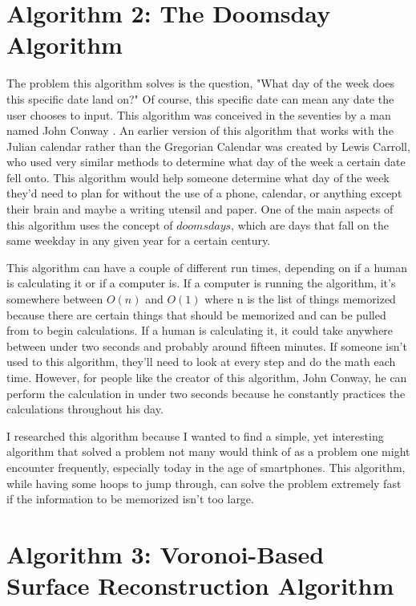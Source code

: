 \documentclass{article}
\begin{document}
\section{Algorithm 2: The Doomsday Algorithm}

The problem this algorithm solves is the question, "What day of the week does this specific date land on?" Of course, this specific date can mean any date the user chooses to input. This algorithm was conceived in the seventies by a man named John Conway \cite{conway}. An earlier version of this algorithm that works with the Julian calendar rather than the Gregorian Calendar was created by Lewis Carroll, who used very similar methods to determine what day of the week a certain date fell onto. This algorithm would help someone determine what day of the week they'd need to plan for without the use of a phone, calendar, or anything except their brain and maybe a writing utensil and paper. One of the main aspects of this algorithm uses the concept of $doomsdays$, which are days that fall on the same weekday in any given year for a certain century. \cite{carroll}

This algorithm can have a couple of different run times, depending on if a human is calculating it or if a computer is. If a computer is running the algorithm, it's somewhere between $O(n)$ and $O(1)$ where n is the list of things memorized because there are certain things that should be memorized and can be pulled from to begin calculations. If a human is calculating it, it could take anywhere between under two seconds and probably around fifteen minutes. If someone isn't used to this algorithm, they'll need to look at every step and do the math each time. However, for people like the creator of this algorithm, John Conway, he can perform the calculation in under two seconds because he constantly practices the calculations throughout his day.\cite{conway}

I researched this algorithm because I wanted to find a simple, yet interesting algorithm that solved a problem not many would think of as a problem one might encounter frequently, especially today in the age of smartphones. This algorithm, while having some hoops to jump through, can solve the problem extremely fast if the information to be memorized isn't too large. 


\section{Algorithm 3: Voronoi-Based Surface Reconstruction Algorithm}
\end{document}
